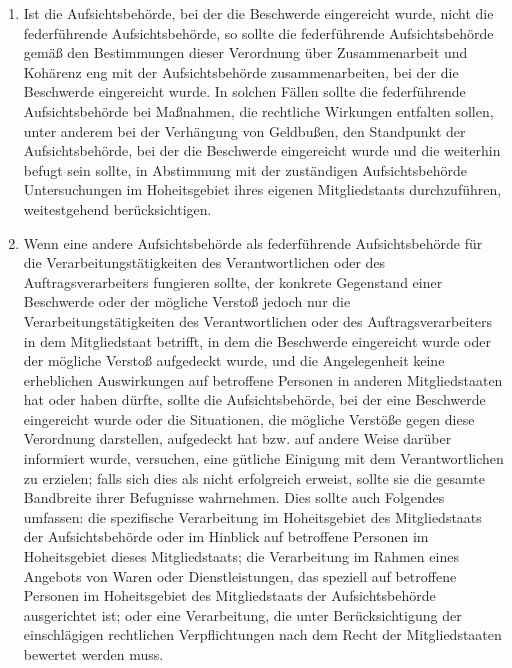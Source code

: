 \begin{enumerate}

   \item Ist die Aufsichtsbehörde, bei der die Beschwerde eingereicht wurde, nicht die federführende Aufsichtsbehörde,
    so sollte die federführende Aufsichtsbehörde gemäß den Bestimmungen dieser Verordnung über Zusammenarbeit und
    Kohärenz eng mit der Aufsichtsbehörde zusammenarbeiten, bei der die Beschwerde eingereicht wurde. In solchen Fällen
    sollte die federführende Aufsichtsbehörde bei Maßnahmen, die rechtliche Wirkungen entfalten sollen, unter anderem
    bei der Verhängung von Geldbußen, den Standpunkt der Aufsichtsbehörde, bei der die Beschwerde eingereicht wurde und
    die weiterhin befugt sein sollte, in Abstimmung mit der zuständigen Aufsichtsbehörde Untersuchungen im
    Hoheitsgebiet ihres eigenen Mitgliedstaats durchzuführen, weitestgehend berücksichtigen.%
   \label{eg:130}
   

   \item Wenn eine andere Aufsichtsbehörde als federführende Aufsichtsbehörde für die Verarbeitungstätigkeiten des
    Verantwortlichen oder des Auftragsverarbeiters fungieren sollte, der konkrete Gegenstand einer Beschwerde oder der
    mögliche Verstoß jedoch nur die Verarbeitungstätigkeiten des Verantwortlichen oder des Auftragsverarbeiters in dem
    Mitgliedstaat betrifft, in dem die Beschwerde eingereicht wurde oder der mögliche Verstoß aufgedeckt wurde, und die
    Angelegenheit keine erheblichen Auswirkungen auf betroffene Personen in anderen Mitgliedstaaten hat oder haben
    dürfte, sollte die Aufsichtsbehörde, bei der eine Beschwerde eingereicht wurde oder die Situationen, die mögliche
    Verstöße gegen diese Verordnung darstellen, aufgedeckt hat bzw. auf andere Weise darüber informiert wurde,
    versuchen, eine gütliche Einigung mit dem Verantwortlichen zu erzielen; falls sich dies als nicht erfolgreich
    erweist, sollte sie die gesamte Bandbreite ihrer Befugnisse wahrnehmen. Dies sollte auch Folgendes umfassen: die
    spezifische Verarbeitung im Hoheitsgebiet des Mitgliedstaats der Aufsichtsbehörde oder im Hinblick auf betroffene
    Personen im Hoheitsgebiet dieses Mitgliedstaats; die Verarbeitung im Rahmen eines Angebots von Waren oder
    Dienstleistungen, das speziell auf betroffene Personen im Hoheitsgebiet des Mitgliedstaats der Aufsichtsbehörde
    ausgerichtet ist; oder eine Verarbeitung, die unter Berücksichtigung der einschlägigen rechtlichen Verpflichtungen
    nach dem Recht der Mitgliedstaaten bewertet werden muss.%
   \label{eg:131}
   

\end{enumerate}

